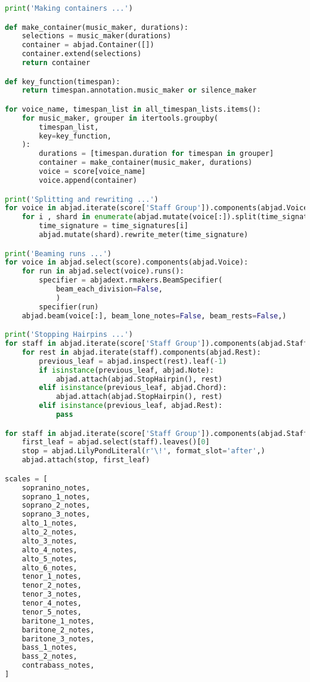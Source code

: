 \begin{lstlisting}[language=Python, caption=Invocation Source Code]
print('Making containers ...')

def make_container(music_maker, durations):
    selections = music_maker(durations)
    container = abjad.Container([])
    container.extend(selections)
    return container

def key_function(timespan):
    return timespan.annotation.music_maker or silence_maker

for voice_name, timespan_list in all_timespan_lists.items():
    for music_maker, grouper in itertools.groupby(
        timespan_list,
        key=key_function,
    ):
        durations = [timespan.duration for timespan in grouper]
        container = make_container(music_maker, durations)
        voice = score[voice_name]
        voice.append(container)

print('Splitting and rewriting ...')
for voice in abjad.iterate(score['Staff Group']).components(abjad.Voice):
    for i , shard in enumerate(abjad.mutate(voice[:]).split(time_signatures)):
        time_signature = time_signatures[i]
        abjad.mutate(shard).rewrite_meter(time_signature)

print('Beaming runs ...')
for voice in abjad.select(score).components(abjad.Voice):
    for run in abjad.select(voice).runs():
        specifier = abjadext.rmakers.BeamSpecifier(
            beam_each_division=False,
            )
        specifier(run)
    abjad.beam(voice[:], beam_lone_notes=False, beam_rests=False,)

print('Stopping Hairpins ...')
for staff in abjad.iterate(score['Staff Group']).components(abjad.Staff):
    for rest in abjad.iterate(staff).components(abjad.Rest):
        previous_leaf = abjad.inspect(rest).leaf(-1)
        if isinstance(previous_leaf, abjad.Note):
            abjad.attach(abjad.StopHairpin(), rest)
        elif isinstance(previous_leaf, abjad.Chord):
            abjad.attach(abjad.StopHairpin(), rest)
        elif isinstance(previous_leaf, abjad.Rest):
            pass

for staff in abjad.iterate(score['Staff Group']).components(abjad.Staff):
    first_leaf = abjad.select(staff).leaves()[0]
    stop = abjad.LilyPondLiteral(r'\!', format_slot='after',)
    abjad.attach(stop, first_leaf)

scales = [
    sopranino_notes,
    soprano_1_notes,
    soprano_2_notes,
    soprano_3_notes,
    alto_1_notes,
    alto_2_notes,
    alto_3_notes,
    alto_4_notes,
    alto_5_notes,
    alto_6_notes,
    tenor_1_notes,
    tenor_2_notes,
    tenor_3_notes,
    tenor_4_notes,
    tenor_5_notes,
    baritone_1_notes,
    baritone_2_notes,
    baritone_3_notes,
    bass_1_notes,
    bass_2_notes,
    contrabass_notes,
]


\end{lstlisting}
